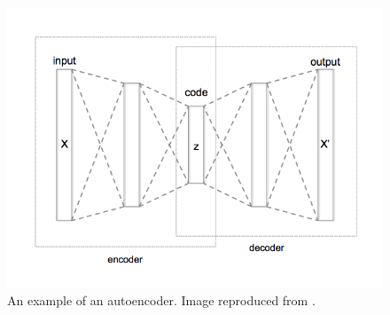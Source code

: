 




\begin{figure}[H]
\centering
\includegraphics[width=0.8\linewidth]{images/Autoencoder_structure}
\caption{An example of an autoencoder. Image reproduced from \cite{wiki:AutoencoderStructure}.}
\label{fig:Autoencoder_structure}
\end{figure}







